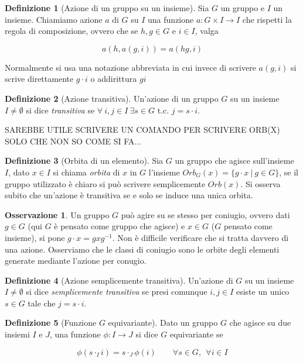 \documentclass[11pt]{article}
\theoremstyle{plain}
\theoremstyle{definition}
\newtheorem{defn}{Definizione}[section]
\newtheorem*{rem}{Osservazione}
\theoremstyle{remark}
\begin{document}
\begin{defn}[Azione di un gruppo su un insieme] Sia $G$ un gruppo e $I$ un insieme. Chiamiamo azione $a$ di $G$ su $I$ una funzione $a:G\times I \to I$ che rispetti la regola di composizione, ovvero che se $h,g\in G$ e $i \in I$, valga

\[ a(h,a(g,i)) = a(hg, i) \]

Normalmente si usa una notazione abbreviata in cui invece di scrivere $a(g,i)$ si scrive direttamente $g\cdot i$ o addirittura $gi$


\label{defn:azione}
\end{defn}


\begin{defn}[Azione transitiva]
Un'azione di un gruppo $G$ su un insieme $I\neq \emptyset$ si dice \textit{transitiva} se $\forall\ i,j\in I\ \exists s\in G$ t.c. $j=s\cdot i$.
\label{defn:azione transitiva}
\end{defn}

SAREBBE UTILE SCRIVERE UN COMANDO PER SCRIVERE ORB(X) SOLO CHE NON SO COME SI FA...
\begin{defn}[Orbita di un elemento]
Sia $G$ un gruppo che agisce sull'insieme $I$, dato $x\in I$ si chiama \textit{orbita} di $x$ in $G$ l'insieme $Orb_{G}(x)=\{ g\cdot x\ |\ g\in G \}$, se il gruppo utilizzato è chiaro si può scrivere semplicemente $Orb(x)$. Si osserva subito che un'azione è transitiva se e solo se induce una unica orbita.
\label{defn:orbita}
\end{defn}
\begin{rem}
	Un gruppo $G$ può agire su se stesso per coniugio, ovvero dati $g\in G$ (qui $G$ è pensato come gruppo che agisce) e $x\in G$ ($G$ pensato come insieme),
	si pone $g\cdot x = gxg^{-1}$. Non è difficile verificare che si tratta davvero di una azione.
	Osserviamo che le classi di coniugio sono le orbite degli elementi generate mediante l'azione per conugio.
\end{rem}




\begin{defn}[Azione semplicemente transitiva]
Un'azione di $G$ su un insieme $I\neq \emptyset$ si dice \textit{semplicemente transitiva}
se presi comunque $i,j\in I$ esiste un unico $s\in G$ tale che $j=s\cdot i$.
\end{defn}


\begin{defn}[Funzione $G$ equivariante]

Dato un gruppo $G$ che agisce su due insiemi $I$ e $J$, una funzione $\phi: I \to J$ si dice $G$ equivariante se 

\[ \phi(s \cdot_I i) = s \cdot_J \phi(i) \qquad \forall s \in G, \ \ \forall i \in I \]


\end{defn}
\end{document}
